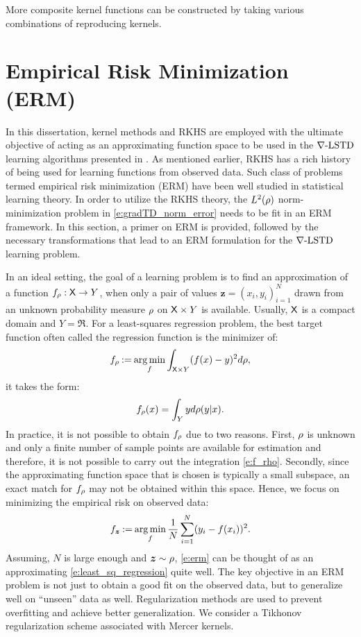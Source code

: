 More composite kernel functions can be constructed by taking various combinations of reproducing kernels. 
\section{Empirical Risk Minimization (ERM)}
\label{s:erm}
In this dissertation, kernel methods and RKHS are employed with the ultimate objective of acting as an approximating function space to be used in the $\nabla\text{-LSTD}$ learning algorithms presented in . As mentioned earlier, RKHS has a rich history of being used for learning functions from observed data. Such class of problems termed empirical risk minimization (ERM) have been well studied in statistical learning theory. In order to utilize the RKHS theory, the $L^2(\rho)$ norm-minimization problem in \eqref{e:gradTD_norm_error} needs to be fit in an ERM framework. In this section, a primer on ERM is provided, followed by the necessary transformations that lead to an ERM formulation for the $\nabla\text{-LSTD}$ learning problem.  

In an ideal setting, the goal of a learning problem is to find an approximation of a function $f_\rho : {\sf X} \to Y$, when only a pair of values $\bm{z} = (x_i, y_i)_{i=1}^N$ drawn from an unknown probability measure $\rho$ on ${\sf X} \times Y$ is available. Usually, ${\sf X}$ is a compact domain and $Y = \Re$. For a least-squares regression problem, the best target function often called the regression function is the minimizer of:
\begin{equation}
f_\pr \eqdef \argmin_f \int_{\state \times Y} (f(x) - y) ^2 d\pr,
\label{e:least_sq_regression}
\end{equation}
it takes the form:
\begin{equation}
f_\pr(x) = \int_Y y d\pr(y|x).
\label{e:f_rho}
\end{equation}
In practice, it is not possible to obtain $f_\rho$ due to two reasons. First, $\rho$ is unknown and only a finite number of sample points are available for estimation and therefore, it is not possible to carry out the integration \eqref{e:f_rho}. Secondly, since the approximating function space that is chosen is typically a small subspace, an exact match for $f_\rho$ may not be obtained within this space. Hence, we focus on minimizing the empirical risk on observed data:
\begin{equation}
f_{\bm{z}} \eqdef \argmin_f \frac{1}{N} \sum_{i=1}^N (y_i - f(x_i))^2.
\label{e:erm}
\end{equation}
Assuming, $N$ is large enough and $\bm{z} \sim \rho$, \eqref{e:erm} can be thought of as an approximating \eqref{e:least_sq_regression} quite well.   
The key objective in an ERM problem is not just to obtain a good fit on the observed data, but to generalize well on ``unseen'' data as well. Regularization methods are used to prevent overfitting and achieve better generalization.   We consider a Tikhonov regularization scheme \cite{tikars79} associated with Mercer kernels.

